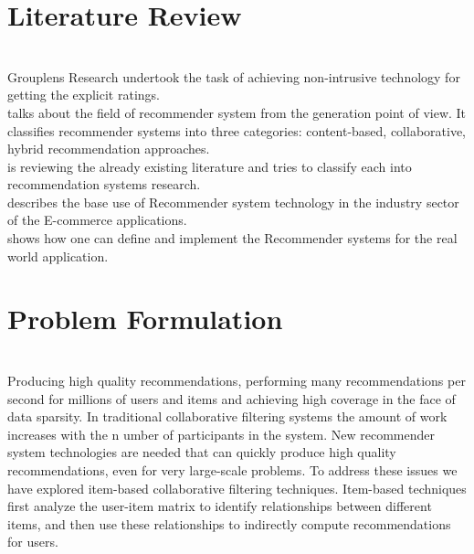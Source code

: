 \documentclass[12pt,a4paper]{article}
\begin{document}
\newpage
	\section{Literature Review}\\
	
	\cite{konstan1997grouplens} Grouplens Research undertook the task of achieving non-intrusive technology for getting the explicit ratings.\\
	
	\cite{adomavicius2005toward} talks about the field of recommender system from the generation point of view. It classifies recommender systems into three categories: content-based, collaborative, hybrid recommendation approaches. \\
	
	\cite{park2012literature} is reviewing the already existing literature and tries to classify each into recommendation systems research.\\
	
	\cite{linden2003amazon} describes the base use of Recommender system technology in the industry sector of the E-commerce applications.\\
	
	\cite{sarwar2001item} shows how one can define and implement the Recommender systems for the real world application.\\
	
	\cite{schein2002methods}
	
	\cite{tintarev2011designing}
	
	\cite{ricci2011introduction}
	
	\cite{ekstrand2011collaborative}
	
	\newpage
	\section{Problem Formulation}

	\textbf{}	\\Producing high quality recommendations, performing many recommendations per second for millions of users and items and achieving high coverage in the face of data sparsity. In traditional collaborative filtering systems the amount of work increases with the n umber of participants in the system. New recommender system technologies are needed that can quickly produce high quality recommendations, even for very large-scale problems. To address these issues we have explored item-based collaborative filtering techniques. Item-based techniques first analyze the user-item matrix to identify relationships between different items, and then use these relationships to indirectly compute recommendations for users. 
\end{document}
